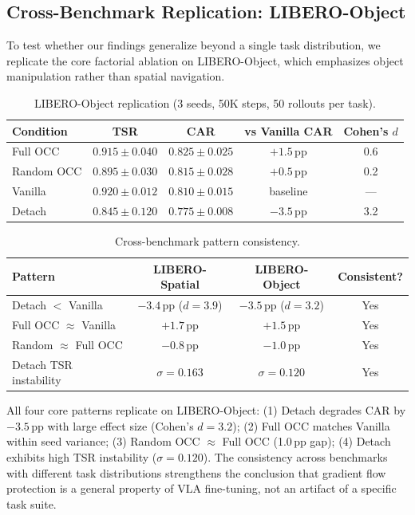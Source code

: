 \documentclass[letterpaper]{article}
\begin{document}
\subsection{Cross-Benchmark Replication: LIBERO-Object}
\label{sec:exp-object}

To test whether our findings generalize beyond a single task distribution, we replicate the core factorial ablation on LIBERO-Object, which emphasizes object manipulation rather than spatial navigation.

\begin{table}[h]
\centering
\caption{LIBERO-Object replication (3 seeds, 50K steps, 50 rollouts per task).}
\label{tab:object}
\begin{tabular}{lcccc}
\toprule
Condition & TSR & CAR & vs Vanilla CAR & Cohen's $d$ \\
\midrule
Full OCC   & $0.915 \pm 0.040$ & $0.825 \pm 0.025$ & $+1.5$\,pp & 0.6 \\
Random OCC & $0.895 \pm 0.030$ & $0.815 \pm 0.028$ & $+0.5$\,pp & 0.2 \\
Vanilla    & $0.920 \pm 0.012$ & $0.810 \pm 0.015$ & baseline   & --- \\
Detach     & $0.845 \pm 0.120$ & $0.775 \pm 0.008$ & $-3.5$\,pp & 3.2 \\
\bottomrule
\end{tabular}
\end{table}

\begin{table}[h]
\centering
\caption{Cross-benchmark pattern consistency.}
\label{tab:cross}
\begin{tabular}{lccc}
\toprule
Pattern & LIBERO-Spatial & LIBERO-Object & Consistent? \\
\midrule
Detach $<$ Vanilla       & $-3.4$\,pp ($d$$=$$3.9$) & $-3.5$\,pp ($d$$=$$3.2$) & Yes \\
Full OCC $\approx$ Vanilla & $+1.7$\,pp             & $+1.5$\,pp               & Yes \\
Random $\approx$ Full OCC  & $-0.8$\,pp             & $-1.0$\,pp               & Yes \\
Detach TSR instability     & $\sigma$$=$$0.163$     & $\sigma$$=$$0.120$       & Yes \\
\bottomrule
\end{tabular}
\end{table}

All four core patterns replicate on LIBERO-Object: (1) Detach degrades CAR by $-3.5$\,pp with large effect size (Cohen's $d = 3.2$); (2) Full OCC matches Vanilla within seed variance; (3) Random OCC $\approx$ Full OCC (1.0\,pp gap); (4) Detach exhibits high TSR instability ($\sigma = 0.120$). The consistency across benchmarks with different task distributions strengthens the conclusion that gradient flow protection is a general property of VLA fine-tuning, not an artifact of a specific task suite.
\end{document}
